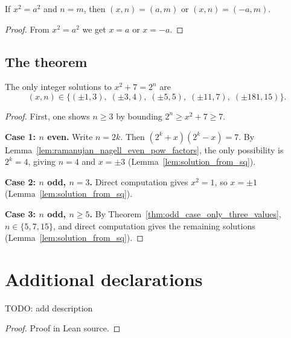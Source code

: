 \begin{lemma}[Solving $x^2 = a^2$]
  \label{lem:solution_from_sq}
  \leanok
  If $x^2 = a^2$ and $n = m$, then $(x, n) = (a, m)$ or $(x, n) = (-a, m)$.
\end{lemma}
\begin{proof}\leanok
  From $x^2 = a^2$ we get $x = a$ or $x = -a$.
\end{proof}

\subsection{The theorem}

\begin{theorem}
  \label{thm:RamanujanNagell}
  \leanok
  The only integer solutions to $x^2 + 7 = 2^n$ are
  \[
    (x, n) \in \{(\pm 1, 3),\; (\pm 3, 4),\; (\pm 5, 5),\; (\pm 11, 7),\; (\pm 181, 15)\}.
  \]
\end{theorem}
\begin{proof}
  \leanok
  First, one shows $n \geq 3$ by bounding $2^n \geq x^2 + 7 \geq 7$.

  \textbf{Case 1: $n$ even.} Write $n = 2k$. Then $(2^k+x)(2^k-x) = 7$.
  By Lemma~\ref{lem:ramanujan_nagell_even_pow_factors}, the only possibility is $2^k = 4$,
  giving $n = 4$ and $x = \pm 3$ (Lemma~\ref{lem:solution_from_sq}).

  \textbf{Case 2: $n$ odd, $n = 3$.} Direct computation gives $x^2 = 1$, so $x = \pm 1$
  (Lemma~\ref{lem:solution_from_sq}).

  \textbf{Case 3: $n$ odd, $n \geq 5$.} By Theorem~\ref{thm:odd_case_only_three_values},
  $n \in \{5, 7, 15\}$, and direct computation gives the remaining solutions
  (Lemma~\ref{lem:solution_from_sq}).
\end{proof}

\section{Additional declarations}

\begin{lemma}
  \label{lem:associated_eq_or_neg}
  \leanok
  TODO: add description
\end{lemma}
\begin{proof}\leanok
  Proof in Lean source.
\end{proof}

